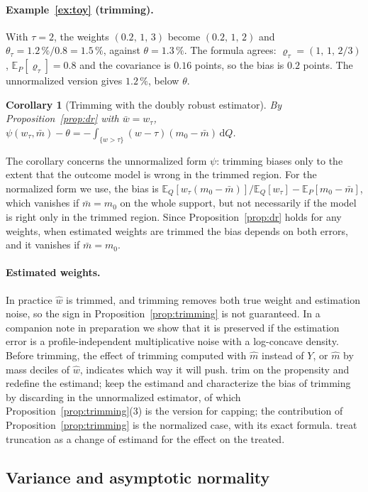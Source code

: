 \documentclass[11pt,a4paper]{article}
\newcommand{\E}{\mathbb{E}}
\newcommand{\dd}{\,\mathrm{d}}
\theoremstyle{plain}
\newtheorem{corollary}{Corollary}
\theoremstyle{definition}
\begin{document}
\paragraph{Example~\ref{ex:toy} (trimming).} With $\tau=2$, the weights $(0.2,\,1,\,3)$ become $(0.2,\,1,\,2)$ and $\theta_\tau=1.2\,\%/0.8=1.5\,\%$, against $\theta=1.3\,\%$. The formula agrees: $\varrho_\tau=(1,\,1,\,2/3)$, $\E_P[\varrho_\tau]=0.8$ and the covariance is $0.16$ points, so the bias is $0.2$ points. The unnormalized version gives $1.2\,\%$, below $\theta$.

\begin{corollary}[Trimming with the doubly robust estimator]\label{cor:drtrimming}
By Proposition~\ref{prop:dr} with $\bar w=w_\tau$, $\psi(w_\tau,\bar m)-\theta=-\int_{\{w>\tau\}}(w-\tau)(m_0-\bar m)\dd Q$.
\end{corollary}
The corollary concerns the unnormalized form $\psi$: trimming biases only to the extent that the outcome model is wrong in the trimmed region. For the normalized form we use, the bias is $\E_Q[w_\tau(m_0-\bar m)]/\E_Q[w_\tau]-\E_P[m_0-\bar m]$, which vanishes if $\bar m=m_0$ on the whole support, but not necessarily if the model is right only in the trimmed region. Since Proposition~\ref{prop:dr} holds for any weights, when estimated weights are trimmed the bias depends on both errors, and it vanishes if $\bar m=m_0$.

\paragraph{Estimated weights.} In practice $\hat w$ is trimmed, and trimming removes both true weight and estimation noise, so the sign in Proposition~\ref{prop:trimming} is not guaranteed. In a companion note in preparation we show that it is preserved if the estimation error is a profile-independent multiplicative noise with a log-concave density. Before trimming, the effect of trimming computed with $\hat m$ instead of $Y$, or $\hat m$ by mass deciles of $\hat w$, indicates which way it will push. \citet{crump2009} trim on the propensity and redefine the estimand; \citet{ma2020} keep the estimand and characterize the bias of trimming by discarding in the unnormalized estimator, of which Proposition~\ref{prop:trimming}(3) is the version for capping; the contribution of Proposition~\ref{prop:trimming} is the normalized case, with its exact formula. \citet{liu2023} treat truncation as a change of estimand for the effect on the treated.

\subsection{Variance and asymptotic normality}
\end{document}
